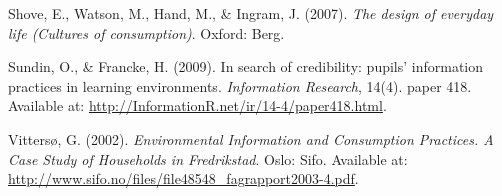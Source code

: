 ﻿\documentclass[a4paper,
fontsize=11pt,
oneside,
numbers=noperiodatend,
parskip=half-,
bibliography=totoc,
final
]{scrartcl}
\begin{document}
Shove, E., Watson, M., Hand, M., \& Ingram, J. (2007). \emph{The design
of everyday life (Cultures of consumption)}. Oxford: Berg.

Sundin, O., \& Francke, H. (2009). In search of credibility: pupils'
information practices in learning environments. \emph{Information
Research}, 14(4). paper 418. Available at:
\url{http://InformationR.net/ir/14-4/paper418.html}.

Vittersø, G. (2002). \emph{Environmental Information and Consumption
Practices. A Case Study of Households in Fredrikstad}. Oslo: Sifo.
Available at:
\url{http://www.sifo.no/files/file48548_fagrapport2003-4.pdf}.

\end{document}
